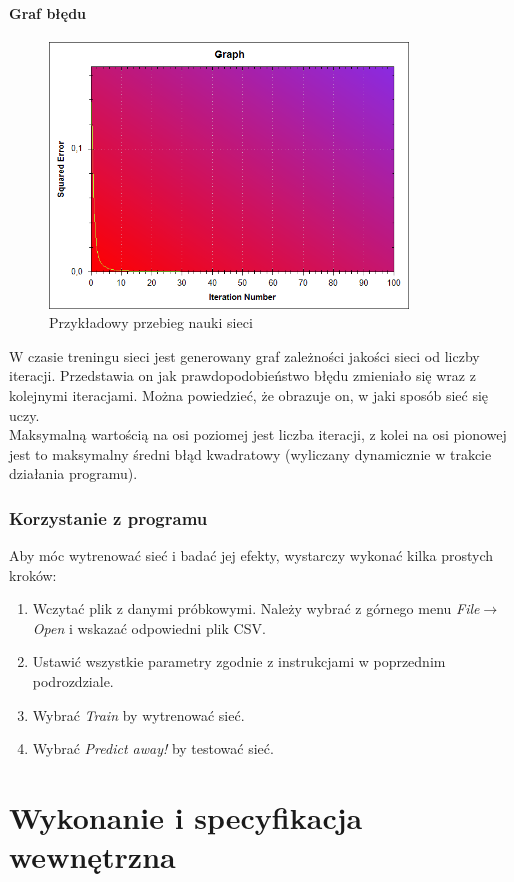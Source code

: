 \documentclass[a4paper]{article}
\begin{document}
			\subsection{Graf błędu}
				\begin{figure}[h!]
					\centering
					\includegraphics[width=0.85\textwidth]{./img/GUI_graph}
					\caption{Przykładowy przebieg nauki sieci}
				\end{figure}
				W czasie treningu sieci jest generowany graf zależności jakości sieci od liczby iteracji. Przedstawia on jak prawdopodobieństwo błędu zmieniało się wraz z kolejnymi iteracjami. Można powiedzieć, że obrazuje on, w jaki sposób sieć się uczy.\\
				Maksymalną wartością na osi poziomej jest liczba iteracji, z kolei na osi pionowej jest to maksymalny średni błąd kwadratowy (wyliczany dynamicznie w trakcie działania programu).
		\section{Korzystanie z programu}
			Aby móc wytrenować sieć i badać jej efekty, wystarczy wykonać kilka prostych kroków:
			\begin{enumerate}
				\item Wczytać plik z danymi próbkowymi. Należy wybrać z górnego menu \textit{File}$ \rightarrow $\emph{Open} i wskazać odpowiedni plik CSV.
				\item Ustawić wszystkie parametry zgodnie z instrukcjami w poprzednim podrozdziale.
				\item Wybrać \emph{Train} by wytrenować sieć.
				\item Wybrać \emph{Predict away!} by testować sieć.
			\end{enumerate}
	\part{Wykonanie i specyfikacja wewnętrzna}
\end{document}
